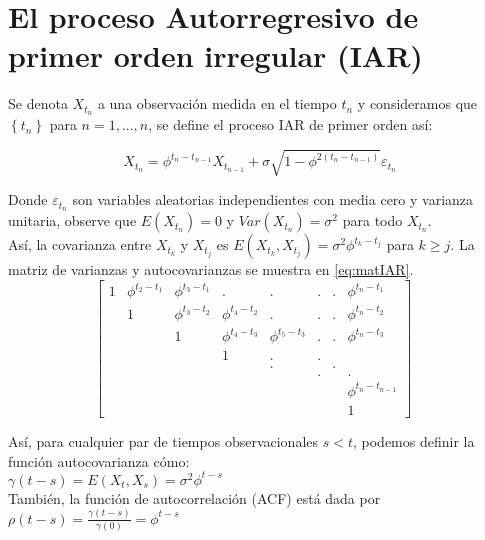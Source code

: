 \section{El proceso Autorregresivo de primer orden irregular (IAR)}

Se denota $X_{t_n}$ a una observación medida en el tiempo $t_n$ y consideramos que $\left\lbrace t_n \right\rbrace$
para $n = 1, ... , n$, se define el proceso IAR de primer orden así:

\begin{equation}
	X_{t_n} = \phi^{t_n - t_{n-1}}X_{t_{n-1}} + \sigma \sqrt{1- \phi^{2(t_n - t_{n-1})} }\varepsilon_{t_n}
\label{eq:IAR}
\end{equation}

Donde $\varepsilon_{t_n}$ son variables aleatorias independientes con media cero
y varianza unitaria, observe que $E(X_{t_n}) = 0$ y $Var(X_{t_n}) = \sigma^2$ para 
todo $X_{t_n}$.\\

Así, la covarianza entre $X_{t_k}$ y $X_{t_j}$ es $E(X_{t_k} ,X_{t_j}) = \sigma^2\phi^{t_k - t_j}$
para $k \geq j$. La matriz de varianzas y autocovarianzas se muestra en  \ref{eq:matIAR}.\\

\begin{equation}
	\begin{bmatrix} 
	1 & \phi^{t_2 - t_1} & \phi^{t_3 - t_1} & .  & . &. &. & \phi^{t_n - t_1}  \\
	& 1 & \phi^{t_3 - t_2} & \phi^{t_4 - t_2}  & . & . & . & \phi^{t_n - t_2} \\
	&  & 1 & \phi^{t_4 - t_3}  & \phi^{t_5 - t_3} & . & . & \phi^{t_n - t_3} \\
	& & & 1& . & . \\
	& & & & .&  & .\\
	& & & & &. & & . \\
	& & & & & & & \phi^{t_n - t_{n-1}} \\
	& & & & & &  & 1 
	\end{bmatrix}
	\quad
	\label{eq:matIAR}
\end{equation}


Así, para cualquier par de tiempos observacionales $s < t$, podemos definir la función
autocovarianza cómo:\\

$\gamma (t-s) = E(X_t, X_s) = \sigma^2 \phi^{t-s}$ \\ 

También, la función de autocorrelación (ACF) está dada por $\rho(t-s) = \frac{\gamma (t-s)}{\gamma (0)} = \phi^{t-s}$\\


